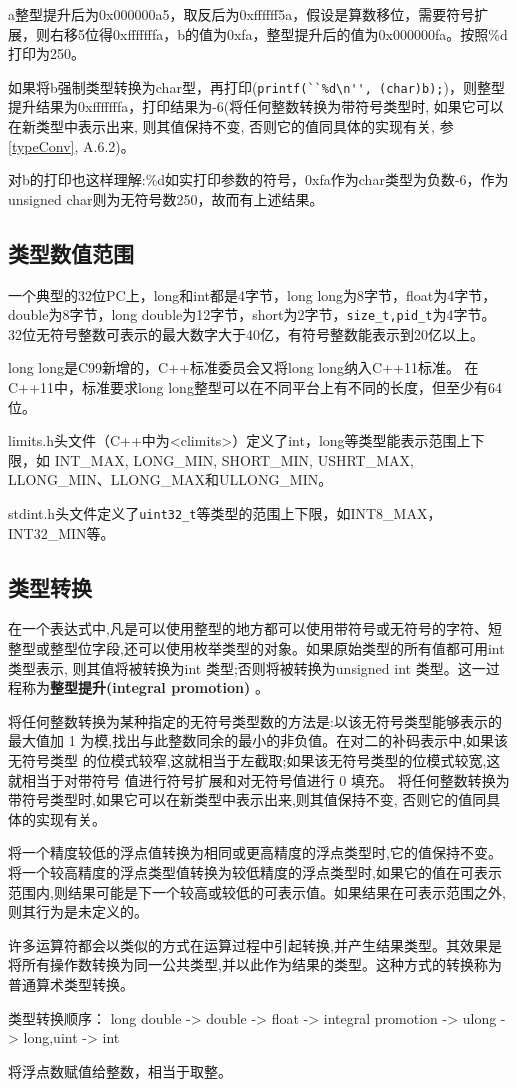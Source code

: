 a整型提升后为0x000000a5，取反后为0xffffff5a，假设是算数移位，需要符号扩展，则右移5位得0xfffffffa，b的值为0xfa，整型提升后的值为0x000000fa。按照\%d打印为250。


如果将b强制类型转换为char型，再打印(\lstinline!printf(``%d\n'', (char)b);!)，则整型提升结果为0xfffffffa，打印结果为-6(将任何整数转换为带符号类型时, 如果它可以在新类型中表示出来, 则其值保持不变, 否则它的值同具体的实现有关, 参\cite{self}\ref{typeConv}, \cite{krc}A.6.2)。 

对b的打印也这样理解:\%d如实打印参数的符号，0xfa作为char类型为负数-6，作为unsigned char则为无符号数250，故而有上述结果。

\subsection{类型数值范围}
一个典型的32位PC上，long和int都是4字节，long long为8字节，float为4字节，double为8字节，long double为12字节，short为2字节，\verb$size_t,pid_t$为4字节。
32位无符号整数可表示的最大数字大于40亿，有符号整数能表示到20亿以上。

long long是C99新增的，C++标准委员会又将long long纳入C++11标准。
在C++11中，标准要求long long整型可以在不同平台上有不同的长度，但至少有64位。

limits.h头文件（C++中为<climits>）定义了int，long等类型能表示范围上下限，如
INT\_MAX, LONG\_MIN, SHORT\_MIN, USHRT\_MAX, LLONG\_MIN、LLONG\_MAX和ULLONG\_MIN。

stdint.h头文件定义了\verb$uint32_t$等类型的范围上下限，如INT8\_MAX，INT32\_MIN等。

\subsection{类型转换}

在一个表达式中,凡是可以使用整型的地方都可以使用带符号或无符号的字符、短整型或整型位字段,还可以使用枚举类型的对象。如果原始类型的所有值都可用int 类型表示, 则其值将被转换为int 类型;否则将被转换为unsigned int 类型。这一过程称为\textbf{整型提升(integral promotion)} 。

将任何整数转换为某种指定的无符号类型数的方法是:以该无符号类型能够表示的最大值加 1 为模,找出与此整数同余的最小的非负值。在对二的补码表示中,如果该无符号类型 的位模式较窄,这就相当于左截取;如果该无符号类型的位模式较宽,这就相当于对带符号 值进行符号扩展和对无符号值进行 0 填充。 将任何整数转换为带符号类型时,如果它可以在新类型中表示出来,则其值保持不变, 否则它的值同具体的实现有关。 

将一个精度较低的浮点值转换为相同或更高精度的浮点类型时,它的值保持不变。将一个较高精度的浮点类型值转换为较低精度的浮点类型时,如果它的值在可表示范围内,则结果可能是下一个较高或较低的可表示值。如果结果在可表示范围之外,则其行为是未定义的。 


许多运算符都会以类似的方式在运算过程中引起转换,并产生结果类型。其效果是将所有操作数转换为同一公共类型,并以此作为结果的类型。这种方式的转换称为普通算术类型转换。


类型转换顺序：
long double -> double -> float -> integral promotion -> ulong -> long,uint -> int

将浮点数赋值给整数，相当于取整。









